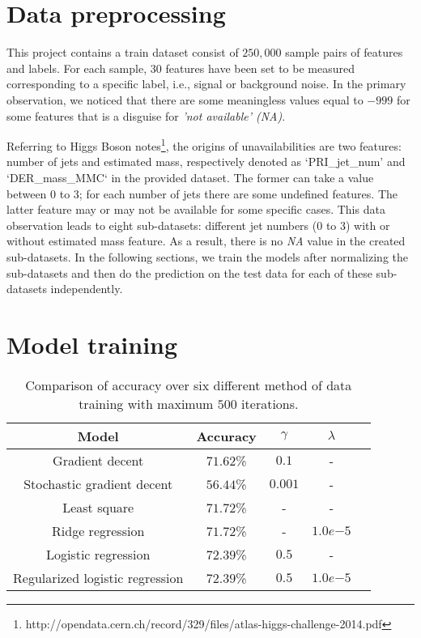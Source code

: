 \documentclass[8pt,conference,compsocconf]{IEEEtran}
\begin{document}
\section{Data preprocessing}\label{sec:data}
This project contains a train dataset consist of $250,000$ sample pairs of features and labels. For each sample, $30$ features have been set to be measured corresponding to a specific label, i.e., signal or background noise. In the primary observation, we noticed that there are some meaningless values equal to $-999$ for some features that is a disguise for \textit{'not available' (NA)}. 

Referring to Higgs Boson notes\footnote{http://opendata.cern.ch/record/329/files/atlas-higgs-challenge-2014.pdf}, the origins of unavailabilities are two features: number of jets and estimated mass, respectively denoted as `PRI\_jet\_num' and `DER\_mass\_MMC` in the provided dataset. The former can take a value between $0$ to $3$; for each number of jets there are some undefined features. The latter feature may or may not be available for some specific cases. This data observation leads to eight sub-datasets: different jet numbers ($0$ to $3$) with or without estimated mass feature. As a result, there is no \textit{NA} value in the created sub-datasets. In the following sections, we train the models after normalizing the sub-datasets and then do the prediction on the test data for each of these sub-datasets independently.
\section{Model training}\label{sec:model}
\begin{table}[t]
	\centering
	\caption{Comparison of accuracy over six different method of data training with maximum $500$ iterations.}
	\begin{tabular}{|c|c|c|c|c|}
		\hline
		Model &Accuracy &$\gamma$ & $\lambda$\\
		\hline
		Gradient decent & $71.62$\%&$0.1$&-\\
		\hline
		Stochastic gradient decent &  $56.44$\% &$0.001$&-\\
		\hline
		Least square &  $71.72$\% &-&-\\
		\hline
		Ridge regression&  $71.72$\% &-&$1.0e{-5}$\\ 
		\hline
		Logistic regression &  $72.39$\% &$0.5$&-\\
		\hline
		Regularized logistic regression&  $72.39$\% &$0.5$&$1.0e{-5}$\\ 
		\hline
	\end{tabular}
	\label{tab:6model_accuracy}
\end{table}
\end{document}
